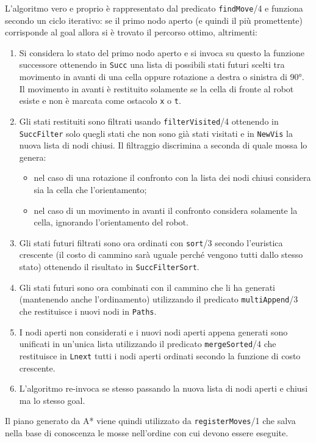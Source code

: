 L'algoritmo vero e proprio è rappresentato dal predicato \texttt{findMove}/4 e funziona secondo un ciclo iterativo: se il primo nodo aperto (e quindi il più promettente) corrisponde al goal allora si è trovato il percorso ottimo, altrimenti:
\begin{enumerate}
	\item Si considera lo stato del primo nodo aperto e si invoca su questo la funzione successore ottenendo in \texttt{Succ} una lista di possibili stati futuri scelti tra movimento in avanti di una cella oppure rotazione a destra o sinistra di \ang{90}. Il movimento in avanti è restituito solamente se la cella di fronte al robot esiste e non è marcata come ostacolo \texttt{x} o \texttt{t}.
	\item Gli stati restituiti sono filtrati usando \texttt{filterVisited}/4 ottenendo in \texttt{SuccFilter} solo quegli stati che non sono già stati visitati e in \texttt{NewVis} la nuova lista di nodi chiusi. Il filtraggio discrimina a seconda di quale mossa lo genera:
	\begin{itemize}
		\item nel caso di una rotazione il confronto con la lista dei nodi chiusi considera sia la cella che l'orientamento;
		\item nel caso di un movimento in avanti il confronto considera solamente la cella, ignorando l'orientamento del robot.
	\end{itemize}
	\item Gli stati futuri filtrati sono ora ordinati con \texttt{sort}/3 secondo l'euristica crescente (il costo di cammino sarà uguale perché vengono tutti dallo stesso stato) ottenendo il risultato in \texttt{SuccFilterSort}.
	\item Gli stati futuri sono ora combinati con il cammino che li ha generati (mantenendo anche l'ordinamento) utilizzando il predicato \texttt{multiAppend}/3 che  restituisce i nuovi nodi in \texttt{Paths}.
	\item I nodi aperti non considerati e i nuovi nodi aperti appena generati sono unificati in un'unica lista utilizzando il predicato \texttt{mergeSorted}/4 che restituisce in \texttt{Lnext} tutti i nodi aperti ordinati secondo la funzione di costo crescente.
	\item L'algoritmo re-invoca se stesso passando la nuova lista di nodi aperti e chiusi ma lo stesso goal.
\end{enumerate}

Il piano generato da A* viene quindi utilizzato da \texttt{registerMoves}/1 che salva nella base di conoscenza le mosse nell'ordine con cui devono essere eseguite.

